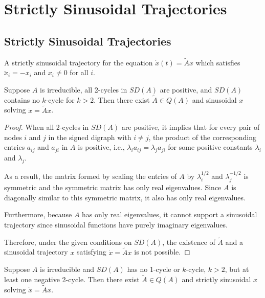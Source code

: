 \chapter{Strictly Sinusoidal Trajectories}
\section{Strictly Sinusoidal Trajectories}
\begin{dfn}
	   	A strictly sinusoidal trajectory for the equation  $\dot{x}(t)=\tilde{A}x$ which satisfies $\ddot{x}_i = -x_i$ and $x_i \neq 0$ for all $i$.
\end{dfn}
\begin{lem}
	Suppose $A$ is irreducible, all 2-cycles in $SD(A)$ are positive, and $SD(A)$ contains no $k$-cycle for $k > 2$. Then there exist $\tilde{A} \in Q(A)$ and sinusoidal $x$ solving $\dot{x} = \tilde{A}x$.
\end{lem}

\begin{proof}
	 When all 2-cycles in $SD(A)$ are positive, it implies that for every pair of nodes $i$ and $j$ in the signed digraph with $i \neq j$, the product of the corresponding entries $a_{ij}$ and $a_{ji}$ in $A$ is positive, i.e., $\lambda_i a_{ij} = \lambda_j a_{ji}$ for some positive constants $\lambda_i$ and $\lambda_j$.
	
	As a result, the matrix formed by scaling the entries of $A$ by $\lambda_i^{1/2}$ and $\lambda_j^{-1/2}$ is symmetric and the symmetric matrix has only real eigenvalues. Since $A$ is diagonally similar to this symmetric matrix, it also has only real eigenvalues.
	
	Furthermore, because $A$ has only real eigenvalues, it cannot support a sinusoidal trajectory since sinusoidal functions have purely imaginary eigenvalues.
	
	Therefore, under the given conditions on $SD(A)$, the existence of $\tilde{A}$ and a sinusoidal trajectory $x$ satisfying $\dot{x} = \tilde{A}x$ is not possible.
	
\end{proof}

\begin{lem}
	Suppose $A$ is irreducible and $SD(A)$ has no 1-cycle or $k$-cycle, $k > 2$, but at least one negative 2-cycle. Then there exist $\tilde{A} \in Q(A)$ and strictly sinusoidal $x$ solving $\dot{x} = \tilde{A}x$.
\end{lem}

